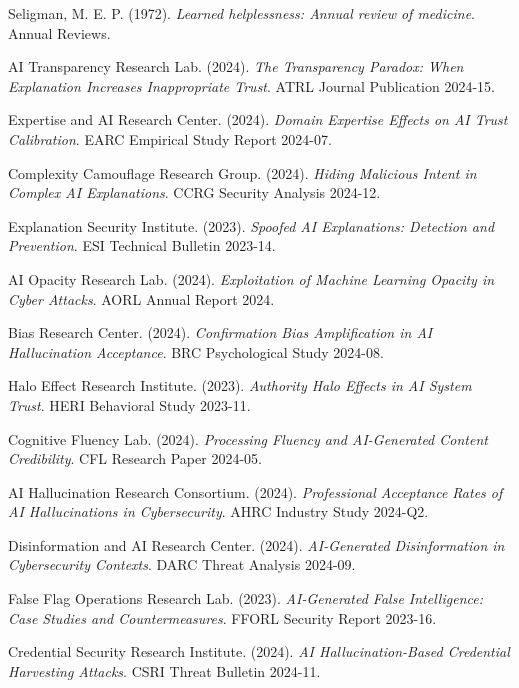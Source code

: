 \documentclass[11pt,a4paper]{article}
\begin{document}
\begin{thebibliography}{99}
Seligman, M. E. P. (1972). \textit{Learned helplessness: Annual review of medicine}. Annual Reviews.

AI Transparency Research Lab. (2024). \textit{The Transparency Paradox: When Explanation Increases Inappropriate Trust}. ATRL Journal Publication 2024-15.

Expertise and AI Research Center. (2024). \textit{Domain Expertise Effects on AI Trust Calibration}. EARC Empirical Study Report 2024-07.

Complexity Camouflage Research Group. (2024). \textit{Hiding Malicious Intent in Complex AI Explanations}. CCRG Security Analysis 2024-12.

Explanation Security Institute. (2023). \textit{Spoofed AI Explanations: Detection and Prevention}. ESI Technical Bulletin 2023-14.

AI Opacity Research Lab. (2024). \textit{Exploitation of Machine Learning Opacity in Cyber Attacks}. AORL Annual Report 2024.

Bias Research Center. (2024). \textit{Confirmation Bias Amplification in AI Hallucination Acceptance}. BRC Psychological Study 2024-08.

Halo Effect Research Institute. (2023). \textit{Authority Halo Effects in AI System Trust}. HERI Behavioral Study 2023-11.

Cognitive Fluency Lab. (2024). \textit{Processing Fluency and AI-Generated Content Credibility}. CFL Research Paper 2024-05.

AI Hallucination Research Consortium. (2024). \textit{Professional Acceptance Rates of AI Hallucinations in Cybersecurity}. AHRC Industry Study 2024-Q2.

Disinformation and AI Research Center. (2024). \textit{AI-Generated Disinformation in Cybersecurity Contexts}. DARC Threat Analysis 2024-09.

False Flag Operations Research Lab. (2023). \textit{AI-Generated False Intelligence: Case Studies and Countermeasures}. FFORL Security Report 2023-16.

Credential Security Research Institute. (2024). \textit{AI Hallucination-Based Credential Harvesting Attacks}. CSRI Threat Bulletin 2024-11.


\end{thebibliography}
\end{document}
